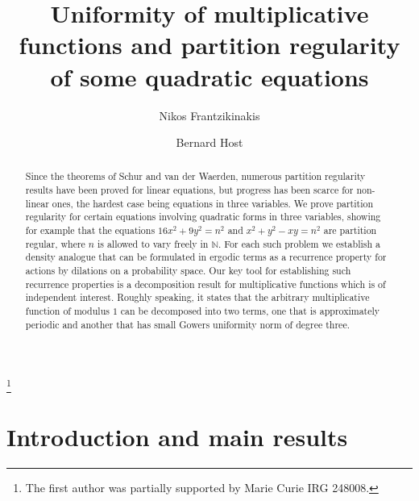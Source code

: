 \documentclass[11pt]{amsart}
\theoremstyle{definition}
\begin{document}
\title[Uniformity of
multiplicative functions and partition regularity]{Uniformity of
multiplicative functions and partition regularity of some quadratic
equations}

\author{Nikos Frantzikinakis}
\address[Nikos Frantzikinakis]{University of Crete, Department of mathematics, Voutes University Campus, Heraklion 71003, Greece} 
\author{Bernard Host}
\address[Bernard Host]{
Universit\'e Paris-Est Marne-la-Vall\'ee, Laboratoire d'analyse et
de math\'ematiques appliqu\'ees, UMR CNRS 8050, 5 Bd Descartes,
77454 Marne la Vall\'ee Cedex, France }

\begin{abstract}
Since the theorems of Schur and van der Waerden, numerous partition
regularity results have been  proved for linear equations, but
progress has been scarce for non-linear ones, the hardest case being
equations in three variables.  We prove partition regularity for certain equations
involving
 quadratic forms in three variables, showing for example that
  the equations $16x^2+9y^2=n^2$ and $x^2+y^2-xy=n^2$ are partition regular, where
  $n$ is allowed to vary freely in ${{\mathbb N}}$.
For each such problem we establish a  density analogue that can be
formulated in ergodic terms as a recurrence property for  actions by
dilations on a probability space. Our key tool for establishing such
recurrence properties is a decomposition result for multiplicative
functions which is of independent interest. Roughly speaking, it
states that the arbitrary multiplicative function of modulus $1$ can be decomposed
into two terms, one that is approximately periodic and another that
has
small Gowers uniformity norm of degree three.
\end{abstract}

\thanks{The  first author was partially supported by
 Marie Curie IRG  248008.}



\maketitle

\section{Introduction and main results}
\end{document}
